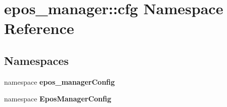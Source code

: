 \section{epos\-\_\-manager\-:\-:cfg \-Namespace \-Reference}
\label{namespaceepos__manager_1_1cfg}
\subsection*{\-Namespaces}
\begin{DoxyCompactItemize}
\item 
namespace {\bf epos\-\_\-manager\-Config}
\item 
namespace {\bf \-Epos\-Manager\-Config}
\end{DoxyCompactItemize}
